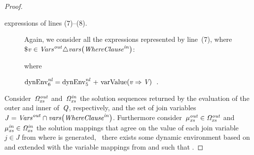 \begin{proof}
\begin{description}
\begin{prooftreefunction}
    \end{prooftreefunction}%

    \pagebreak[3]
  \item[\LET expressions of lines (7)--(8).] Again, we consider all the \LET expressions represented by line~(7),
    where~$\$\mathit{v} \in {\mathit{\ensuremath{\mathit{Vars}}}}_{\mathit{}}^{\mathit{out}} \triangle \mathit{vars}\!\left({\mathit{{\textit{Whe\-re\-Clause}}}}_{\mathit{}}^{\mathit{in}}\right)$:

    \begin{prooftreefunction}


    \end{prooftreefunction}%
    where 
    \begin{small}
      $\mathrm{dynEnv}_{6}^{\mathit{nl}} = \mathrm{dynEnv}_{5}^{\mathit{nl}}\textrm{ + }\textrm{varValue}\!\left( \mathit{v} \Rightarrow \mathit{{V}_{}} \right) \enspace .$
    \end{small}%
  \end{description}

  Consider~${\mathit{\Omega}}_{\mathit{xs}}^{\mathit{out}}$ and~${\mathit{\Omega}}_{\mathit{xs}}^{\mathit{in}}$ the solution sequences returned by the evaluation of the outer and inner
   of~$\mathit{{Q}_{}}$, respectively, and the set of join variables~$J = {\mathit{\mathit{Vars}}}_{\mathit{}}^{\mathit{out}} \cap
  \mathit{vars}\!\left({\mathit{{\textit{Whe\-re\-Clause}}}}_{\mathit{}}^{\mathit{in}}\right)$.
  Furthermore consider~${\mathit{\mu}}_{\mathit{xs}}^{\mathit{out}} \in {\mathit{\Omega}}_{\mathit{xs}}^{\mathit{out}}$ and~${\mathit{\mu}}_{\mathit{xs}}^{\mathit{in}} \in {\mathit{\Omega}}_{\mathit{xs}}^{\mathit{in}}$ the solution mappings that
  agree on the value of each join variable~$j \in J$ from where  is generated, \ie~there exists some
  dynamic environment  based on \dyn and extended with the variable mappings from  and
   such that .



\end{proof}
